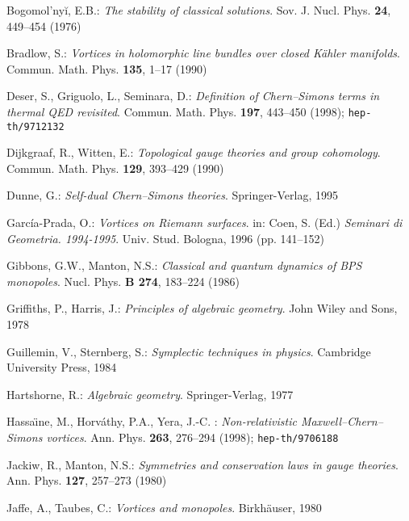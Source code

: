 \documentclass[a4paper,11pt]{article}
\begin{document}
\begin{thebibliography}{99}

\begin{small}

{\sc Bogomol'ny\u i, E.B.}: {\it The stability of classical solutions}.
Sov. J. Nucl. Phys. {\bf 24}, 449--454 (1976)

{\sc Bradlow, S.}: {\it Vortices in holomorphic line bundles over
closed K\"ahler manifolds}. Commun. Math. Phys. {\bf 135}, 1--17 (1990)

{\sc Deser, S.}, {\sc Griguolo, L.}, {\sc Seminara, D.}: 
{\it Definition of Chern--Simons terms in thermal QED\coordHE{} revisited}.
Commun. Math. Phys. {\bf 197}, 443--450 (1998); {\tt hep-th/9712132}

{\sc Dijkgraaf, R.}, {\sc Witten, E.}: {\it Topological gauge theories
and group cohomology}. Commun. Math. Phys. {\bf 129}, 393--429 (1990)

{\sc Dunne, G.}: {\it Self-dual Chern--Simons theories}. 
Springer-Verlag, 1995

{\sc Garc\'ia-Prada, O.}: {\it Vortices on Riemann surfaces}. 
in: {\sc Coen, S.} (Ed.) {\it Seminari di Geometria. 1994-1995}. Univ.
Stud. Bologna, 1996 (pp. 141--152)

{\sc Gibbons, G.W.}, {\sc Manton, N.S.}: {\it Classical and quantum
dynamics of BPS monopoles}. Nucl. Phys. {\bf B 274}, 183--224 (1986)

{\sc Griffiths, P.}, {\sc Harris, J.}: {\it Principles of algebraic
geometry}. John Wiley and Sons, 1978

{\sc Guillemin, V.}, {\sc Sternberg, S.}: {\it Symplectic techniques
in physics}. Cambridge University Press, 1984

{\sc Hartshorne, R.}: {\it Algebraic geometry}. Springer-Verlag, 1977

{\sc Hassa\"\i ne, M.}, {\sc Horv\'athy, P.A.},
{\sc Yera, J.-C.} : {\it Non-relativistic Maxwell--Chern--Simons
vortices}. Ann. Phys. {\bf 263}, 276--294 (1998); {\tt hep-th/9706188}

{\sc Jackiw, R.}, {\sc Manton, N.S.}: {\it Symmetries and
conservation laws in gauge theories}. Ann. Phys. {\bf 127}, 257--273 (1980)

{\sc Jaffe, A.}, {\sc Taubes, C.}: {\it Vortices and monopoles}. 
Birkh\"auser, 1980


\end{small}
\end{thebibliography}
\end{document}
